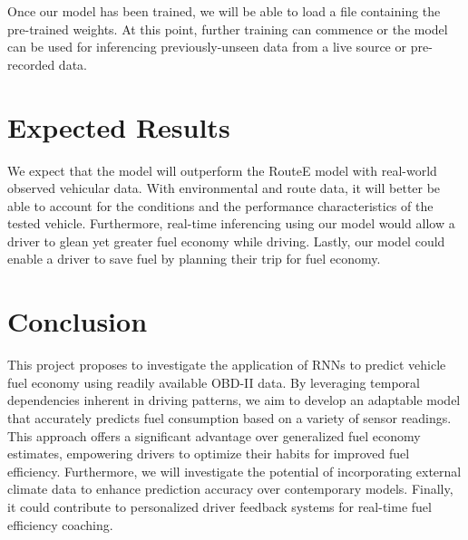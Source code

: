 \documentclass[letterpaper]{article}
\begin{document}

Once our model has been trained, we will be able to load a file containing the pre-trained weights. 
At this point, further training can commence or the model can be used for inferencing previously-unseen data from a live source or pre-recorded data.

\section{Expected Results}

We expect that the model will outperform the RouteE model with real-world observed vehicular data. 
With environmental and route data, 
it will better be able to account for the conditions and the performance characteristics of the tested vehicle.
Furthermore, real-time inferencing using our model would allow a driver to glean yet greater fuel economy while driving.
Lastly, our model could enable a driver to save fuel by planning their trip for fuel economy.

\section{Conclusion}

This project proposes to investigate the application of RNNs to predict vehicle fuel economy using readily available OBD-II data. 
By leveraging temporal dependencies inherent in driving patterns, 
we aim to develop an adaptable model that accurately predicts fuel consumption based on a variety of sensor readings. 
This approach offers a significant advantage over generalized fuel economy estimates, 
empowering drivers to optimize their habits for improved fuel efficiency. 
Furthermore, we will investigate the potential of incorporating external climate data to enhance prediction accuracy over contemporary models.
Finally, it could contribute to personalized driver feedback systems for real-time fuel efficiency coaching. 


 

\end{document}
